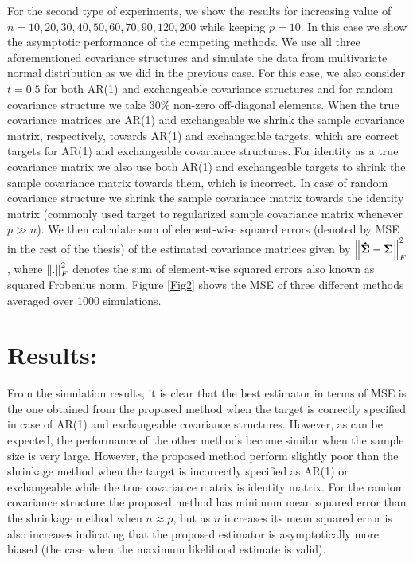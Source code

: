 For the second type of experiments, we show the results for increasing value of $n= 10,20,30,40,50,60,70,90,120,200$ while keeping $p=10$. In this case we show the asymptotic performance of the competing methods. We use all three aforementioned covariance structures and simulate the data from multivariate normal distribution as we did in the previous case. For this case, we also consider $t=0.5$ for both AR(1) and exchangeable covariance structures and for random covariance structure we take 30\% non-zero off-diagonal elements. When the true covariance matrices are AR(1) and exchangeable we shrink the sample covariance matrix, respectively, towards AR(1) and exchangeable targets, which are correct targets for AR(1) and exchangeable covariance structures. For identity as a true covariance matrix we also use both AR(1) and exchangeable targets to shrink the sample covariance matrix towards them, which is incorrect. In case of random covariance structure we shrink the sample covariance matrix towards the identity matrix (commonly used target to regularized sample covariance matrix whenever $p \gg n$). We then calculate sum of element-wise squared errors (denoted by MSE in the rest of the thesis) of the estimated covariance matrices given by $ \left\lVert\boldsymbol{\hat{\Sigma}} - \boldsymbol{\Sigma}\right\rVert_{F}^{2}$, 
where $\left\lVert.\right\rVert^{2}_{F}$ denotes the sum of element-wise squared errors also known as squared Frobenius norm. Figure \ref{Fig2} shows the MSE of three different methods averaged over 1000 simulations.
\section*{Results:}
From the simulation results, it is clear that the best estimator in terms of MSE is the one obtained from the proposed method when the target is correctly specified in case of AR(1) and exchangeable covariance structures. However, as can be expected, the performance of the other methods become similar when the sample size is very large. However, the proposed method perform slightly poor than the shrinkage method when the target is incorrectly specified as AR(1) or exchangeable while the true covariance matrix is identity matrix. For the random covariance structure the proposed method has minimum mean squared error than the shrinkage method when $n \approx p$, but as $n$ increases its mean squared error is also increases indicating that the proposed estimator is asymptotically more biased (the case when the maximum likelihood estimate is valid). 

